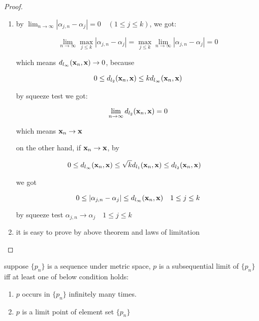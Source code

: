 \begin{proof}

    \begin{enumerate}
        \item by $\lim_{n \to \infty}|\alpha_{j,n} - \alpha_j| = 0 \quad (1 \le j \le k)$, we got:

    \[
        \lim_{n \to \infty}\max_{j \le k}|\alpha_{j,n} - \alpha_j| = \max_{j \le k}\lim_{n \to \infty}|\alpha_{j,n} - \alpha_j| = 0
    \]

    which means $d_{l_{\infty}}(\mathbf{x}_n, \mathbf{x}) \to 0$, because 

    \begin{align*}
    0 \le d_{l_2}(\mathbf{x}_n, \mathbf{x}) \le kd_{l_{\infty}}(\mathbf{x}_n, \mathbf{x})
    \end{align*}

    by squeeze test we got:

    \[
        \lim_{n \to \infty}d_{l_2}(\mathbf{x}_n, \mathbf{x}) = 0
    \]

    which means $\mathbf{x}_n \to \mathbf{x}$

    on the other hand, if $\mathbf{x}_n \to \mathbf{x}$, by


    \begin{align*}
    0 & \le d_{l_{\infty}}(\mathbf{x}_n, \mathbf{x}) \le  \sqrt{k} d_{l_1}(\mathbf{x}_n, \mathbf{x}) \le d_{l_2}(\mathbf{x}_n, \mathbf{x}) 
    \end{align*}

    we got

    \[
        0  \le |\alpha_{j,n} - \alpha_j| \le d_{l_\infty}(\mathbf{x}_n, \mathbf{x}) \quad 1 \le j\le k
    \]

    by squeeze test $\alpha_{j,n} \to \alpha_j \quad 1 \le j \le k$

    \item it is easy to prove by above theorem and laws of limitation
    \end{enumerate}
\end{proof}

\begin{thm}
    \label{thm:3-1-2}
    suppose $\{p_n\}$ is a sequence under metric space, $p$ is a subsequential limit of $\{p_n\}$ iff at least one of below condition holds:

    \begin{enumerate}
        \item $p$ occurs in $\{p_n\}$ infinitely many times.

        \item $p$ is a limit point of element set $\{ p_n \}$
    \end{enumerate}
\end{thm}

